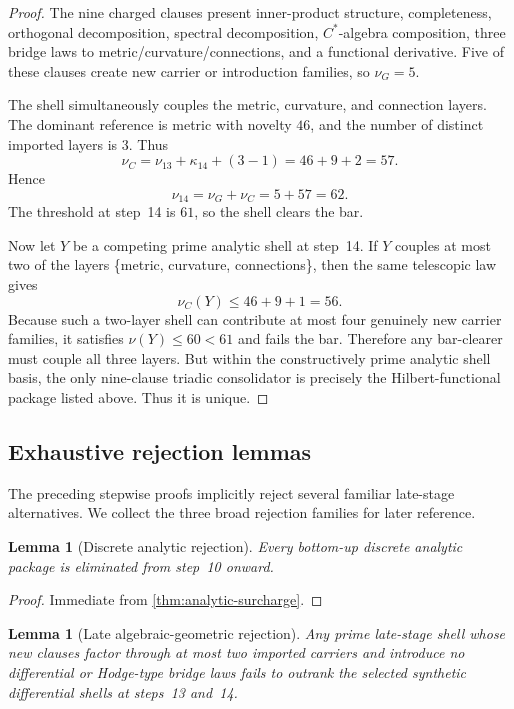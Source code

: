 \documentclass[11pt]{article}
\theoremstyle{plain}
\newtheorem{lemma}[theorem]{Lemma}
\theoremstyle{definition}
\theoremstyle{remark}
\begin{document}
\begin{proof}
The nine charged clauses present inner-product structure, completeness, orthogonal decomposition, spectral decomposition, $C^*$-algebra composition, three bridge laws to metric/curvature/connections, and a functional derivative. Five of these clauses create new carrier or introduction families, so $\nu_G=5$.

The shell simultaneously couples the metric, curvature, and connection layers. The dominant reference is metric with novelty $46$, and the number of distinct imported layers is $3$. Thus
\[
  \nu_C = \nu_{13}+\kappa_{14}+(3-1)=46+9+2=57.
\]
Hence
\[
  \nu_{14}=\nu_G+\nu_C=5+57=62.
\]
The threshold at step~14 is $61$, so the shell clears the bar.

Now let $Y$ be a competing prime analytic shell at step~14. If $Y$ couples at most two of the layers \{metric, curvature, connections\}, then the same telescopic law gives
\[
  \nu_C(Y)\le 46+9+1=56.
\]
Because such a two-layer shell can contribute at most four genuinely new carrier families, it satisfies $\nu(Y)\le60<61$ and fails the bar. Therefore any bar-clearer must couple all three layers. But within the constructively prime analytic shell basis, the only nine-clause triadic consolidator is precisely the Hilbert-functional package listed above. Thus it is unique.
\end{proof}

\subsection{Exhaustive rejection lemmas}

The preceding stepwise proofs implicitly reject several familiar late-stage alternatives. We collect the three broad rejection families for later reference.

\begin{lemma}[Discrete analytic rejection]
\label{lem:discrete-rejection}
Every bottom-up discrete analytic package is eliminated from step~10 onward.
\end{lemma}

\begin{proof}
Immediate from \cref{thm:analytic-surcharge}.
\end{proof}

\begin{lemma}[Late algebraic-geometric rejection]
\label{lem:algebraic-rejection}
Any prime late-stage shell whose new clauses factor through at most two imported carriers and introduce no differential or Hodge-type bridge laws fails to outrank the selected synthetic differential shells at steps~13 and~14.
\end{lemma}
\end{document}
